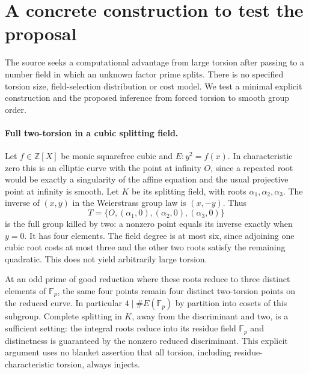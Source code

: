 \documentclass[11pt]{article}
\begin{document}
\section{A concrete construction to test the proposal}
The source seeks a computational advantage from large torsion after
passing to a number field in which an unknown factor prime splits.
There is no specified torsion size, field-selection distribution or
cost model. We test a minimal explicit construction and the proposed
inference from forced torsion to smooth group order.

\paragraph{Full two-torsion in a cubic splitting field.}
Let $f\in\mathbb Z[X]$ be monic squarefree cubic and
$E:y^2=f(x)$. In characteristic zero this is an elliptic curve with
the point at infinity $O$, since a repeated root would be exactly a
singularity of the affine equation and the usual projective point at
infinity is smooth. Let $K$ be its splitting field, with roots
$\alpha_1,\alpha_2,\alpha_3$. The inverse of $(x,y)$ in the
Weierstrass group law is $(x,-y)$. Thus
\[
T=\{O,(\alpha_1,0),(\alpha_2,0),(\alpha_3,0)\}
\]
is the full group killed by two: a nonzero point equals its inverse
exactly when $y=0$. It has four elements. The field degree is at most
six, since adjoining one cubic root costs at most three and the other
two roots satisfy the remaining quadratic. This does not yield
arbitrarily large torsion.

At an odd prime of good reduction where these roots reduce to three
distinct elements of $\mathbb F_p$, the same four points remain
four distinct two-torsion points on the reduced curve. In particular
$4\mid\#E(\mathbb F_p)$ by partition into cosets of this subgroup.
Complete splitting in $K$, away from the discriminant and two, is a
sufficient setting: the integral roots reduce into its residue field
$\mathbb F_p$ and distinctness is guaranteed by the nonzero reduced
discriminant. This explicit argument uses no blanket assertion that
all torsion, including residue-characteristic torsion, always injects.
\end{document}
